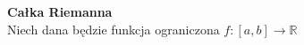 \documentclass[a4paper,11pt]{article}
\begin{document}
\flushleft\Large\textbf{Całka Riemanna}\\
Niech dana będzie funkcja ograniczona $f\colon[{a,b}]\rightarrow\mathbb{R}$
\end{document}
